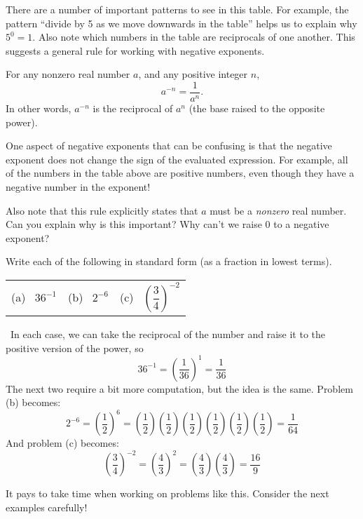 There are a number of important patterns to see in this table. For example, the pattern ``divide by 5 as we move downwards in the table'' helps us to explain why $5^0 = 1$. Also note which numbers in the table are reciprocals of one another. This suggests a general rule for working with negative exponents.

\begin{boxdef}
For any nonzero real number $a$, and any positive integer $n$, \[a^{-n}=\frac{1}{a^n}.\]
In other words, $a^{-n}$ is the reciprocal of $a^n$ (the base raised to the opposite power).
\end{boxdef}

One aspect of negative exponents that can be confusing is that the negative exponent does not change the sign of the evaluated expression. For example, all of the numbers in the table above are positive numbers, even though they have a negative number in the exponent!

Also note that this rule explicitly states that $a$ must be a \textit{nonzero} real number. Can you explain why is this important? Why can't we raise 0 to a negative exponent?

\begin{boxex}
Write each of the following in standard form (as a fraction in lowest terms).

\begin{center}
\begin{tabularx}{0.6\textwidth}{XXX}
(a)~ $36^{-1}$
&
(b)~ $2^{-6}$
&
(c)~ $\left(\dfrac{3}{4}\right)^{-2}$
\end{tabularx}
\end{center}

\exsoln\ In each case, we can take the reciprocal of the number and raise it to the positive version of the power, so \[36^{-1} = \left(\frac{1}{36}\right)^1 = \frac{1}{36}\]
The next two require a bit more computation, but the idea is the same. Problem (b) becomes:
\[2^{-6} = \left(\frac{1}{2}\right)^6 = \left(\frac{1}{2}\right)\left(\frac{1}{2}\right)\left(\frac{1}{2}\right)\left(\frac{1}{2}\right)\left(\frac{1}{2}\right)\left(\frac{1}{2}\right) = \frac{1}{64}\]
And problem (c) becomes:
\[\left(\frac{3}{4}\right)^{-2} = \left(\frac{4}{3}\right)^2 = \left(\frac{4}{3}\right)\left(\frac{4}{3}\right) = \frac{16}{9}\]
\end{boxex}

It pays to take time when working on problems like this. Consider the next examples carefully!

